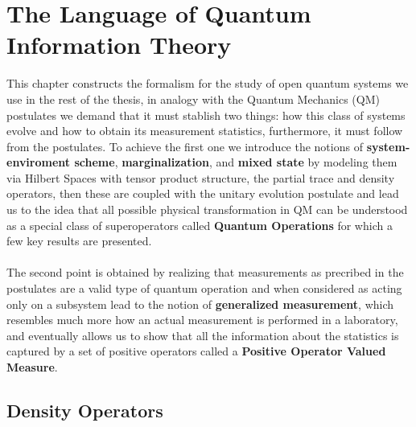 \chapter{The Language of Quantum Information Theory}
This chapter constructs the formalism for the study of open quantum systems we use in the rest of the thesis, in analogy with the
Quantum Mechanics (QM) postulates we demand that it must stablish two things: how this class of systems evolve and how to obtain its measurement
statistics, furthermore, it must follow from the postulates. To achieve the first one we introduce the notions of \textbf{system-enviroment scheme}, \textbf{marginalization}, and
\textbf{mixed state} by modeling them via Hilbert Spaces with tensor product structure, the partial trace and density operators, then these
are coupled with the unitary evolution postulate and lead us to the idea that all possible physical transformation in QM can be understood as a
special class of superoperators called \textbf{Quantum Operations} for which a few key results are presented.
\\\\
The second point is
obtained by realizing that measurements as precribed in the postulates are a valid type of quantum operation and when considered
as acting only on a subsystem lead to the notion of \textbf{generalized measurement}, which resembles much more how an actual measurement is
performed in a laboratory, and eventually allows us to show that all the information about the statistics is captured by
a set of positive operators called a \textbf{Positive Operator Valued Measure}.
\section{Density Operators}

